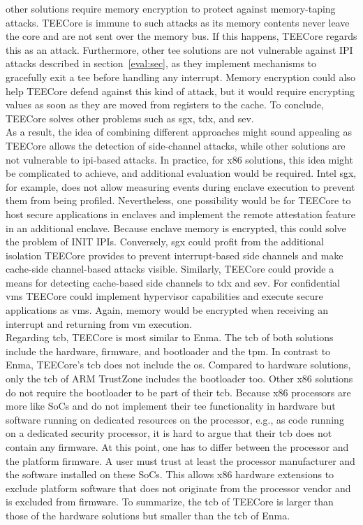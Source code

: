 other solutions require memory encryption to protect against memory-taping
attacks. TEECore is immune to such attacks as its memory contents never leave
the core and are not sent over the memory bus. If this happens, TEECore regards
this as an attack. Furthermore, other \gls{tee} solutions are not vulnerable
against IPI attacks described in section~\ref{eval:sec}, as they implement
mechanisms to gracefully exit a \gls{tee} before handling any interrupt. Memory
encryption could also help TEECore defend against this kind of attack, but it
would require encrypting values as soon as they are moved from registers to the
cache. To conclude, TEECore solves other problems such as \gls{sgx}, \gls{tdx},
and \gls{sev}. \\

As a result, the idea of combining different approaches might sound appealing as
TEECore allows the detection of side-channel attacks, while other solutions are
not vulnerable to \gls{ipi}-based attacks. In practice, for x86 solutions, this
idea might be complicated to achieve, and additional evaluation would be
required. Intel \gls{sgx}, for example, does not allow measuring events during
enclave execution to prevent them from being profiled. Nevertheless, one
possibility would be for TEECore to host secure applications in enclaves and
implement the remote attestation feature in an additional enclave. Because
enclave memory is encrypted, this could solve the problem of INIT IPIs.
Conversely, \gls{sgx} could profit from the additional isolation TEECore
provides to prevent interrupt-based side channels and make cache-side
channel-based attacks visible. Similarly, TEECore could provide a means for
detecting cache-based side channels to \gls{tdx} and \gls{sev}. For confidential
\glspl{vm} TEECore could implement hypervisor capabilities and execute secure
applications as \glspl{vm}. Again, memory would be encrypted when receiving an
interrupt and returning from \gls{vm} execution. \\

Regarding \gls{tcb}, TEECore is most similar to Enma. The \gls{tcb} of both
solutions include the hardware, firmware, and bootloader and the \gls{tpm}. In
contrast to Enma, TEECore's \gls{tcb} does not include the \gls{os}. Compared to
hardware solutions, only the \gls{tcb} of ARM TrustZone includes the bootloader
too. Other x86 solutions do not require the bootloader to be part of their
\gls{tcb}. Because x86 processors are more like SoCs and do not implement their
\gls{tee} functionality in hardware but software running on dedicated resources
on the processor, e.g., as code running on a dedicated security processor, it is
hard to argue that their \gls{tcb} does not contain any firmware. At this point,
one has to differ between the processor and the platform firmware. A user must
trust at least the processor manufacturer and the software installed on these
SoCs. This allows x86 hardware extensions to exclude platform software that does
not originate from the processor vendor and is excluded from firmware. To
summarize, the \gls{tcb} of TEECore is larger than those of the hardware
solutions but smaller than the \gls{tcb} of Enma.

\cleardoublepage


